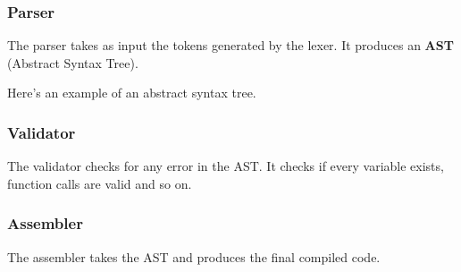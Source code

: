 \documentclass[../documentation.tex]{subfiles}
\begin{document}
\pagebreak

\subsubsection{Parser}

The parser takes as input the tokens generated by the lexer.
It produces an \textbf{AST} (Abstract Syntax Tree).

Here's an example of an abstract syntax tree.

\begin{center}
\end{center}

\subsubsection{Validator}

The validator checks for any error in the AST.
It checks if every variable exists, function calls are valid and so on.

\subsubsection{Assembler}

The assembler takes the AST and produces the final compiled code.
\end{document}

